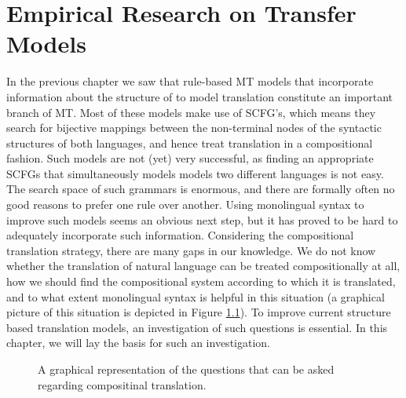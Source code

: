 \chapter{Empirical Research on Transfer Models}
\label{ch:empirical}

In the previous chapter we saw that rule-based MT models that incorporate information about the structure of to model translation constitute an important branch of MT. Most of these models make use of SCFG's, which means they search  for bijective mappings between the non-terminal nodes of the syntactic structures of both languages, and hence treat translation in a compositional fashion. Such models are not (yet) very successful, as finding an appropriate SCFGs that simultaneously models models two different languages is not easy. The search space of such grammars is enormous, and there are formally often no good reasons to prefer one rule over another. Using monolingual syntax to improve such models seems an obvious next step, but it has proved to be hard to adequately incorporate such information. Considering the compositional translation strategy, there are many gaps in our knowledge. We do not know whether the translation of natural language can be treated compositionally at all, how we should find the compositional system according to which it is translated, and to what extent monolingual syntax is helpful in this situation (a graphical picture of this situation is depicted in Figure \ref{fig:comptrans2}). To improve current structure based translation models, an investigation of such questions is essential. In this chapter, we will lay the basis for such an investigation. 

\begin{figure}[!ht]
\begin{framed}
\centering

\end{framed}
\caption{A graphical representation of the questions that can be asked regarding compositinal translation.}\label{fig:comptrans2}
\end{figure}

